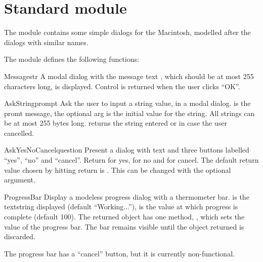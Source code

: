 \section{Standard module }

The  module contains some simple dialogs for
the Macintosh, modelled after the  dialogs with similar
names.

The  module defines the following functions:

\renewcommand{\indexsubitem}{(in module EasyDialogs)}

\begin{funcdesc}{Message}{str}
A modal dialog with the message text , which should be at
most 255 characters long, is displayed. Control is returned when the
user clicks ``OK''.
\end{funcdesc}

\begin{funcdesc}{AskString}{prompt}
Ask the user to input a string value, in a modal dialog. 
is the promt message, the optional  arg is the initial
value for the string. All strings can be at most 255 bytes
long.  returns the string entered or  in
case the user cancelled.
\end{funcdesc}

\begin{funcdesc}{AskYesNoCancel}{question}
Present a dialog with text  and three buttons labelled
``yes'', ``no'' and ``cancel''. Return  for yes,  for
no and  for cancel. The default return value chosen by
hitting return is . This can be changed with the optional
 argument.
\end{funcdesc}

\begin{funcdesc}{ProgressBar}{}
Display a modeless progress dialog with a thermometer bar. 
is the textstring displayed (default ``Working...''),  is
the value at which progress is complete (default 100). The returned
object has one method, , which sets the value of the
progress bar. The bar remains visible until the object returned is
discarded.

The progress bar has a ``cancel'' button, but it is currently
non-functional.
\end{funcdesc}


